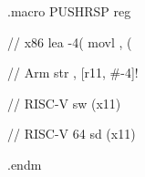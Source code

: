 .macro PUSHRSP reg

// x86
lea -4(%
movl \reg, (%

// Arm
str \reg, [r11, #-4]!

// RISC-V
sw (x11)

// RISC-V 64
sd (x11)

.endm


